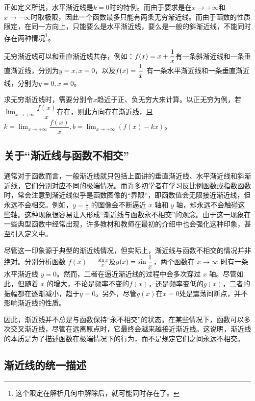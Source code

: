 正如定义所说，水平渐近线是$k=0$时的特例。而由于要求是在$x\to +\infty$和$x\to -\infty$时取极限，因此一个函数最多只能有两条无穷渐近线。而由于函数的性质限定，在同一方向上，只能要么是水平渐近线，要么是一般的斜渐近线，不能同时存在两种情况\footnote{这个限定在解析几何中解除后，就可能同时存在了。}。

无穷渐近线可以和垂直渐近线共存，例如：$\displaystyle f(x)=x+{1\over x}$有一条斜渐近线和一条垂直渐近线，分别为$y=x,x=0$，以及$\displaystyle f(x)={1\over x}$ 有一条水平渐近线和一条垂直渐近线，分别为$y=0,x=0$。

求无穷渐近线时，需要分别令$x$趋近于正、负无穷大来计算。以正无穷为例，若$\displaystyle \lim_{x \to +\infty} \dfrac{f(x)}{x}$存在，则此方向存在渐近线，且$\displaystyle k=\lim_{x \to +\infty} \dfrac{f(x)}{x},b = \lim_{x \to +\infty}\left(f(x) - kx\right)$。

\subsection{关于“渐近线与函数不相交”}

通常对于函数而言，一般渐近线就只包括上面讲的垂直渐近线、水平渐近线和斜渐近线，它们分别对应不同的极端情况。而许多初学者在学习反比例函数或指数函数时，常会注意到渐近线似乎是函数图像的“界限”，即函数值会无限接近渐近线，但永远不会相交。例如，$\displaystyle y = \frac{1}{x}$ 的图像会不断逼近 $x$ 轴和 $y$ 轴，却永远不会触碰这些轴。这种现象很容易让人形成“渐近线与函数永不相交”的观念。由于这一现象在一些典型函数中经常出现，许多教材和教师在最初的介绍中也会强化这种印象，甚至引入定义中。

尽管这一印象源于典型的渐近线情况，但实际上，渐近线与函数不相交的情况并非绝对。分别分析函数 $\displaystyle f(x) = \frac{\sin x}{x}$及$\displaystyle g(x)=\sin {1\over x}$，两个函数在 $x \to \infty$ 时有一条水平渐近线 $y = 0$。然而，二者在逼近渐近线的过程中会多次穿过 $x$ 轴。尽管如此，但随着 $x$ 的增大，不论是频率不变的$f(x)$，还是频率变低的$g(x)$，二者的振幅都在逐渐减小，趋于$y = 0$。另外，尽管$g(x)$在$x=0$处是震荡间断点，并不影响渐近线的性质。

因此，渐近线并不总是与函数保持“永不相交”的状态。在某些情况下，函数可以多次交叉渐近线，尽管在远离原点时，它最终会越来越接近渐近线。这说明，渐近线的本质是为了描述函数在极端情况下的行为，而不是规定它们之间永远不相交。

\subsection{渐近线的统一描述}

